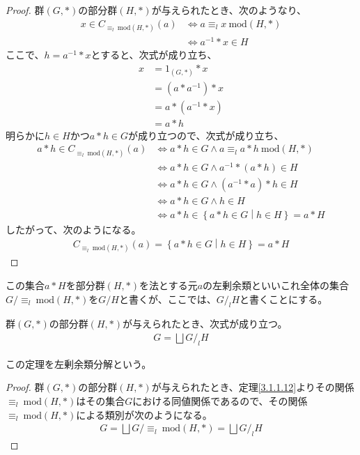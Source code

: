 \documentclass[dvipdfmx]{jsarticle}
\begin{document}
\begin{proof} 群$(G,*)$の部分群$(H,*)$が与えられたとき、次のようなり、
\begin{align*}
x \in C_{\equiv_{l}\ \mathrm{mod}(H,*)}(a) &\Leftrightarrow a \equiv_{l}x\ \mathrm{mod}(H,*)\\
&\Leftrightarrow a^{- 1}*x \in H
\end{align*}
ここで、$h = a^{- 1}*x$とすると、次式が成り立ち、
\begin{align*}
x &= 1_{(G,*)}*x\\
&= \left( a*a^{- 1} \right)*x\\
&= a*\left( a^{- 1}*x \right)\\
&= a*h
\end{align*}
明らかに$h \in H$かつ$a*h \in G$が成り立つので、次式が成り立ち、
\begin{align*}
a*h \in C_{\equiv_{l}\ \mathrm{mod}(H,*)}(a) &\Leftrightarrow a*h \in G \land a \equiv_{l}a*h\ \mathrm{mod}(H,*)\\
&\Leftrightarrow a*h \in G \land a^{- 1}*(a*h) \in H\\
&\Leftrightarrow a*h \in G \land \left( a^{- 1}*a \right)*h \in H\\
&\Leftrightarrow a*h \in G \land h \in H\\
&\Leftrightarrow a*h \in \left\{ a*h \in G \middle| h \in H \right\} = a*H
\end{align*}
したがって、次のようになる。
\begin{align*}
C_{\equiv_{l}\ \mathrm{mod}(H,*)}(a) = \left\{ a*h \in G \middle| h \in H \right\} = a*H
\end{align*}
\end{proof}
\begin{dfn}
この集合$a*H$を部分群$(H,*)$を法とする元$a$の左剰余類といいこれ全体の集合${G}/{\equiv_{l}\ \mathrm{mod}(H,*)}$を$G/H$と書くが、ここでは、${G}/_l {H}$と書くことにする。
\end{dfn}
\begin{thm}[左剰余類分解]\label{3.1.1.12s}
群$(G,*)$の部分群$(H,*)$が与えられたとき、次式が成り立つ。
\begin{align*}
G=\bigsqcup G/_l H
\end{align*}\par
この定理を左剰余類分解という。
\end{thm}
\begin{proof}
群$(G,*)$の部分群$(H,*)$が与えられたとき、定理\ref{3.1.1.12}よりその関係$\equiv_{l}\ \mathrm{mod}(H,*)$はその集合$G$における同値関係であるので、その関係$\equiv_{l}\ \mathrm{mod}(H,*)$による類別が次のようになる。
\begin{align*}
G=\bigsqcup {G}/{\equiv_{l}\ \mathrm{mod}(H,*)}=\bigsqcup G/_l H
\end{align*}
\end{proof}
\end{document}
